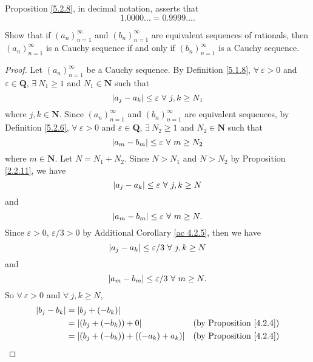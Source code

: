 \begin{remark}\label{5.2.9}
    Proposition \ref{5.2.8}, in decimal notation, asserts that
    \[
        1.0000 \dots = 0.9999 \dots.
    \]
\end{remark}

\exercisesection

\begin{exercise}\label{ex 5.2.1}
    Show that if \((a_n)_{n = 1}^{\infty}\) and \((b_n)_{n = 1}^{\infty}\) are equivalent sequences of rationals, then \((a_n)_{n = 1}^{\infty}\) is a Cauchy sequence if and only if \((b_n)_{n = 1}^{\infty}\) is a Cauchy sequence.
\end{exercise}

\begin{proof}
    Let \((a_n)_{n = 1}^{\infty}\) be a Cauchy sequence.
    By Definition \ref{5.1.8}, \(\forall\ \varepsilon > 0\) and \(\varepsilon \in \mathbf{Q}\), \(\exists\ N_1 \geq 1\) and \(N_1 \in \mathbf{N}\) such that
    \[
        \abs*{a_j - a_k} \leq \varepsilon \ \forall\ j, k \geq N_1
    \]
    where \(j, k \in \mathbf{N}\).
    Since \((a_n)_{n = 1}^{\infty}\) and \((b_n)_{n = 1}^{\infty}\) are equivalent sequences, by Definition \ref{5.2.6}, \(\forall\ \varepsilon > 0\) and \(\varepsilon \in \mathbf{Q}\), \(\exists\ N_2 \geq 1\) and \(N_2 \in \mathbf{N}\) such that
    \[
        \abs*{a_m - b_m} \leq \varepsilon \ \forall\ m \geq N_2
    \]
    where \(m \in \mathbf{N}\).
    Let \(N = N_1 + N_2\).
    Since \(N > N_1\) and \(N > N_2\) by Proposition \ref{2.2.11}, we have
    \[
        \abs*{a_j - a_k} \leq \varepsilon \ \forall\ j, k \geq N
    \]
    and
    \[
        \abs*{a_m - b_m} \leq \varepsilon \ \forall\ m \geq N.
    \]
    Since \(\varepsilon > 0\), \(\varepsilon / 3 > 0\) by Additional Corollary \ref{ac 4.2.5}, then we have
    \[
        \abs*{a_j - a_k} \leq \varepsilon / 3 \ \forall\ j, k \geq N
    \]
    and
    \[
        \abs*{a_m - b_m} \leq \varepsilon / 3 \ \forall\ m \geq N.
    \]
    So \(\forall\ \varepsilon > 0\) and \(\forall\ j, k \geq N\),
    \begin{align*}
        \abs*{b_j - b_k} & = \abs*{b_j + (-b_k)}                                                                                        \\
                         & = \abs*{(b_j + (-b_k)) + 0}                                            & \text{(by Proposition \ref{4.2.4})} \\
                         & = \abs*{(b_j + (-b_k)) + ((-a_k) + a_k)}                               & \text{(by Proposition \ref{4.2.4})} \\

\end{align*}
\end{proof}
